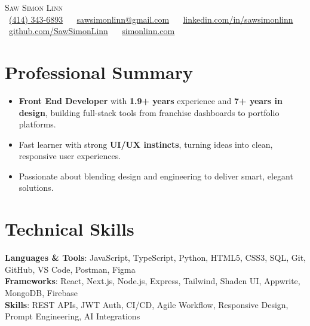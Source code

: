 \documentclass[letterpaper,11pt]{article}
\newcommand{\resumeItem}[1]{
  \item\small{
    {#1 \vspace{0pt}}
  }
}
\newcommand{\resumeSubHeadingListStart}{\begin{itemize}[leftmargin=0.0in, label={}]}
\newcommand{\resumeSubHeadingListEnd}{\end{itemize}}\vspace{0pt}
\newcommand{\resumeItemListStart}{\begin{itemize}}
\newcommand{\resumeItemListEnd}{\end{itemize}\vspace{-5pt}}
\begin{document}
\begin{center}
    {\Large \scshape Saw Simon Linn} \\[2mm]
    \footnotesize \raisebox{-0.1\height}
    \faPhone~\underline{(414) 343-6893} ~ 
    \faEnvelope~\underline{sawsimonlinn@gmail.com} ~ 
    \faLinkedin~\href{https://www.linkedin.com/in/sawsimonlinn}{\underline{linkedin.com/in/sawsimonlinn}} ~ 
    \faGithub~\href{https://github.com/SawSimonLinn}{\underline{github.com/SawSimonLinn}} ~ 
    \faBriefcase~\href{https://www.simonlinn.com/}{\underline{simonlinn.com}}
\end{center}


\section{Professional Summary} 
\vspace{-1pt}
  \resumeItemListStart
    \resumeItem{
      \textbf{Front End Developer} with \textbf{1.9+ years} experience and \textbf{7+ years in design}, building full-stack tools from franchise dashboards to portfolio platforms.
    }
\vspace{-3pt}
    \resumeItem{
      Fast learner with strong \textbf{UI/UX instincts}, turning ideas into clean, responsive user experiences.
    }
\vspace{-3pt}
    \resumeItem{
      Passionate about blending design and engineering to deliver smart, elegant solutions.
    }
  \resumeItemListEnd


 \vspace{-12pt}

 
\section{Technical Skills}
\begin{itemize}[leftmargin=0.15in, label={}]
  \small{\item{
    \textbf{Languages \& Tools}{: JavaScript, TypeScript, Python, HTML5, CSS3, SQL, Git, GitHub, VS Code, Postman, Figma} \\[1mm]
    \textbf{Frameworks}{: React, Next.js, Node.js, Express, Tailwind, Shadcn UI, Appwrite, MongoDB, Firebase} \\[1mm]
    \textbf{Skills}{: REST APIs, JWT Auth, CI/CD, Agile Workflow, Responsive Design, Prompt Engineering, AI Integrations}
  }}
\end{itemize}
 \vspace{-12pt}
\end{document}
